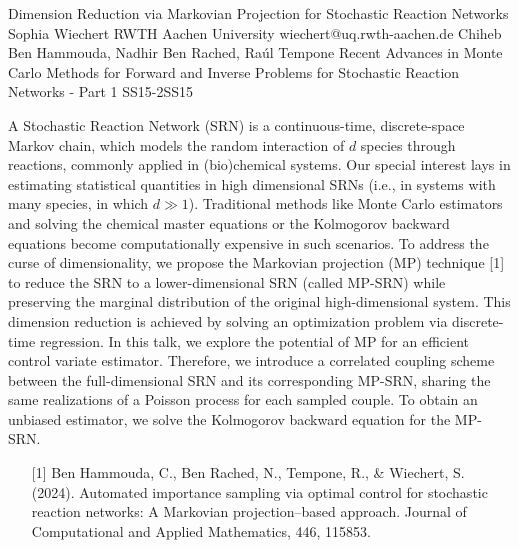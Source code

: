 \begin{talk}
  {Dimension Reduction via Markovian Projection for Stochastic Reaction Networks}%
  {Sophia Wiechert}%
  {RWTH Aachen University}%
  {wiechert@uq.rwth-aachen.de}%
  {Chiheb Ben Hammouda, Nadhir Ben Rached, Raúl Tempone}%
{Recent Advances in Monte Carlo Methods for Forward and Inverse Problems for Stochastic Reaction Networks - Part 1}
{}{SS15-2}{SS15}


A Stochastic Reaction Network (SRN) is a continuous-time, discrete-space Markov chain, which models the random interaction of $d$ species through reactions, commonly applied in (bio)chemical systems.
Our special interest lays in estimating statistical quantities in high dimensional SRNs (i.e., in systems with many species, in which $d\gg1$). Traditional methods like Monte Carlo estimators and solving the chemical master equations or the Kolmogorov backward equations become computationally expensive in such scenarios.
To address the curse of dimensionality, we propose the Markovian projection (MP) technique [1] to reduce the SRN to a lower-dimensional SRN (called MP-SRN) while preserving the marginal distribution of the original high-dimensional system. This dimension reduction is achieved by solving an optimization problem via discrete-time regression.
In this talk, we explore the potential of MP for an efficient control variate estimator.  Therefore,  we introduce a correlated coupling scheme between the full-dimensional SRN and its corresponding MP-SRN, sharing the same realizations of a Poisson process for each sampled couple. To obtain an unbiased estimator, we solve the Kolmogorov backward equation for the MP-SRN.




\medskip


\begin{enumerate}
	\item[{[1]}] Ben Hammouda, C., Ben Rached, N., Tempone, R., \& Wiechert, S. (2024). Automated importance sampling via optimal control for stochastic reaction networks: A Markovian projection–based approach. Journal of Computational and Applied Mathematics, 446, 115853.
\end{enumerate}

\end{talk}

